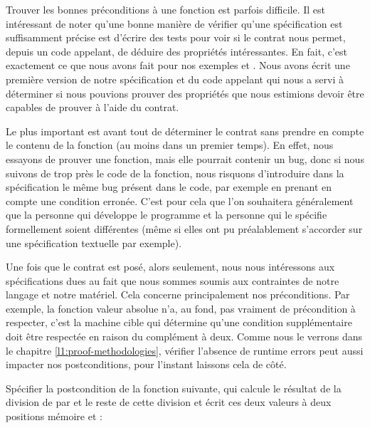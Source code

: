 

Trouver les bonnes préconditions à une fonction est parfois difficile. Il est
intéressant de noter qu'une bonne manière de vérifier qu'une spécification est
suffisamment précise est d'écrire des tests pour voir si le contrat nous permet,
depuis un code appelant, de déduire des propriétés intéressantes. En fait,
c'est exactement ce que nous avons fait pour nos exemples  et
. Nous avons écrit une première version de notre spécification
et du code appelant qui nous a servi à déterminer si nous pouvions prouver des
propriétés que nous estimions devoir être capables de prouver à l'aide du
contrat.



Le plus important est avant tout de déterminer le contrat sans prendre en compte
le contenu de la fonction (au moins dans un premier temps). En effet, nous
essayons de prouver une fonction, mais elle pourrait contenir un bug, donc si
nous suivons de trop près le code de la fonction, nous risquons d'introduire
dans la spécification le même bug présent dans le code, par exemple en prenant
en compte une condition erronée. C'est pour cela que
l'on souhaitera généralement que la personne qui développe le programme et la
personne qui le spécifie formellement soient différentes (même si elles ont pu
préalablement s'accorder sur une spécification textuelle par exemple).



Une fois que le contrat est posé, alors seulement, nous nous intéressons aux
spécifications dues au fait que nous sommes soumis aux contraintes de notre langage
et notre matériel. Cela concerne principalement nos préconditions. Par exemple,
la fonction valeur absolue n'a, au fond, pas  vraiment de précondition à respecter,
c'est la machine cible qui détermine qu'une condition supplémentaire doit être
respectée en raison du complément à deux. Comme nous le verrons dans le chapitre
\ref{l1:proof-methodologies}, vérifier l'absence de runtime errors peut aussi
impacter nos postconditions, pour l'instant laissons cela de côté.






Spécifier la postcondition de la fonction suivante, qui calcule le résultat
de la division de  par  et le reste de cette
division et écrit ces deux valeurs à deux positions mémoire 
et  :


